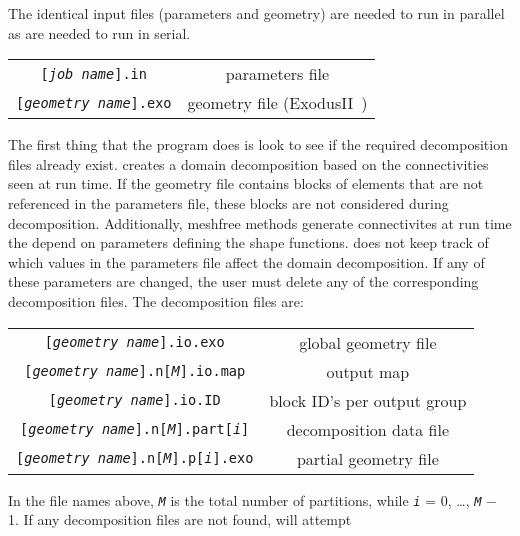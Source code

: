 The identical input files (parameters and geometry) are needed to run in
parallel as are needed to run in serial.
\begin{center}
\begin{tabular}[c]{c c}
 \parbox[b]{3.0in}{\raggedleft \texttt{[\textsl{job name}].in}}
&\parbox[b]{3.0in}{parameters file}\\
 \parbox[b]{3.0in}{\raggedleft \texttt{[\textsl{geometry name}].exo}}
&\parbox[b]{3.0in}{geometry file (\textsf{ExodusII}~\cite{ExodusII})}\\
\end{tabular}
\end{center}
The first thing that the program does is look to see if the required
decomposition files already exist.  \tahoe creates a domain decomposition
based on the connectivities seen at run time.  If the geometry file
contains blocks of elements that are not referenced in the parameters file,
these blocks are not considered during decomposition.  Additionally,
meshfree methods generate connectivites at run time the depend on
parameters defining the shape functions.  \tahoe does not keep track of
which values in the parameters file affect the domain decomposition.  If
any of these parameters are changed, the user must delete any of the
corresponding decomposition files.  The decomposition files are:
\begin{center}
\begin{tabular}[c]{c c}
 \parbox[b]{3.0in}{\raggedleft \texttt{[\textsl{geometry name}].io.exo}}
&\parbox[b]{3.0in}{global geometry file}\\
 \parbox[b]{3.0in}{\raggedleft \texttt{[\textsl{geometry name}].n[\textsl{M}].io.map}}
&\parbox[b]{3.0in}{output map}\\
 \parbox[b]{3.0in}{\raggedleft \texttt{[\textsl{geometry name}].io.ID}}
&\parbox[b]{3.0in}{block ID's per output group}\\
 \parbox[b]{3.0in}{\raggedleft \texttt{[\textsl{geometry name}].n[\textsl{M}].part[\textsl{i}]}}
&\parbox[b]{3.0in}{decomposition data file}\\
 \parbox[b]{3.0in}{\raggedleft \texttt{[\textsl{geometry name}].n[\textsl{M}].p[\textsl{i}].exo}}
&\parbox[b]{3.0in}{partial geometry file}
\end{tabular}
\end{center}
In the file names above, \texttt{\textsl{M}} is the total number of partitions, 
while \texttt{\textsl{i}} =
0, \ldots, \texttt{\textsl{M}} $-$ 1.  
If any decomposition files are not found, \tahoe will attempt
